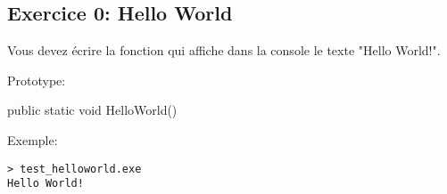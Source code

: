 \subsection{Exercice 0: Hello World}

Vous devez écrire la fonction  qui affiche dans la console le texte
"Hello World!".

Prototype:
\begin{code}
public static void HelloWorld()
\end{code}

Exemple:
\begin{verbatim}
> test_helloworld.exe
Hello World!
\end{verbatim}